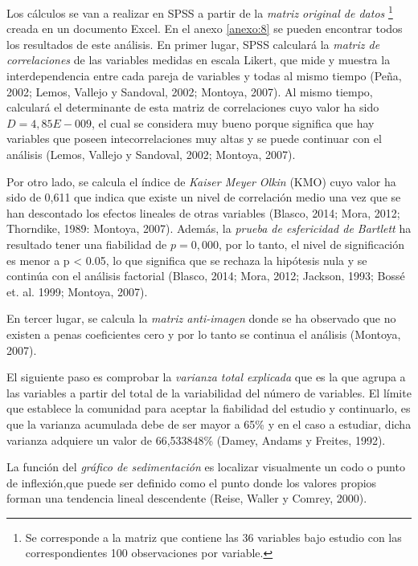 Los cálculos se van a realizar en SPSS a partir de la \emph{matriz original de datos} \footnote{Se corresponde a la matriz que contiene las 36 variables bajo estudio con las correspondientes 100 observaciones por variable.} creada en un documento Excel. En el anexo \ref{anexo:8} se pueden encontrar todos los resultados de este análisis. En primer lugar, SPSS calculará la \emph{matriz de correlaciones} de las variables medidas en escala Likert, que mide y muestra la interdependencia entre cada pareja de variables y todas al mismo tiempo (Peña, 2002; Lemos, Vallejo y Sandoval, 2002; Montoya, 2007). Al mismo tiempo, calculará el determinante de esta matriz de correlaciones cuyo valor ha sido $ D = 4,85E-009 $, el cual se considera muy bueno porque significa que hay variables que poseen intecorrelaciones muy altas y se puede continuar con el análisis (Lemos, Vallejo y Sandoval, 2002; Montoya, 2007).

Por otro lado, se calcula el índice de \emph{Kaiser Meyer Olkin} (KMO) cuyo valor ha sido de 0,611 que indica que existe un nivel de correlación medio una vez que se han descontado los efectos lineales de otras variables (Blasco, 2014; Mora, 2012; Thorndike, 1989: Montoya, 2007). Además, la \emph{prueba de esfericidad de Bartlett} ha resultado tener una fiabilidad de $ p = 0,000 $, por lo tanto, el nivel de significación es menor a p < 0.05, lo que significa que se rechaza la hipótesis nula y se continúa con el análisis factorial (Blasco, 2014; Mora, 2012; Jackson, 1993; Bossé et. al. 1999; Montoya, 2007).

En tercer lugar, se calcula la \emph{matriz anti-imagen} donde se ha observado que no existen a penas coeficientes cero y por lo tanto se continua el análisis (Montoya, 2007).

El siguiente paso es comprobar la \emph{varianza total explicada} que es la que agrupa a las variables a partir del total de la variabilidad del número de variables. El límite que establece la comunidad para aceptar la fiabilidad del estudio y continuarlo, es que la varianza acumulada debe de ser mayor a 65\% y en el caso a estudiar, dicha varianza adquiere un valor de 66,533848\% (Damey, Andams y Freites, 1992).

La función del \emph{gráfico de sedimentación} es localizar visualmente un codo o punto de inflexión,que puede ser definido como el punto donde los valores propios forman una tendencia lineal descendente (Reise, Waller y Comrey, 2000).


